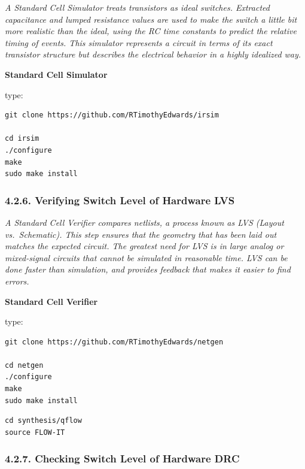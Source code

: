 \documentclass[
]{article}
\begin{document}
\emph{A Standard Cell Simulator treats transistors as ideal switches.
Extracted capacitance and lumped resistance values are used to make the
switch a little bit more realistic than the ideal, using the RC time
constants to predict the relative timing of events. This simulator
represents a circuit in terms of its exact transistor structure but
describes the electrical behavior in a highly idealized way.}

\textbf{Standard Cell Simulator}

type:

\begin{verbatim}
git clone https://github.com/RTimothyEdwards/irsim

cd irsim
./configure
make
sudo make install
\end{verbatim}

\hypertarget{verifying-switch-level-of-hardware-lvs}{%
\subsubsection{4.2.6. Verifying Switch Level of Hardware
LVS}\label{verifying-switch-level-of-hardware-lvs}}

\emph{A Standard Cell Verifier compares netlists, a process known as LVS
(Layout vs.~Schematic). This step ensures that the geometry that has
been laid out matches the expected circuit. The greatest need for LVS is
in large analog or mixed-signal circuits that cannot be simulated in
reasonable time. LVS can be done faster than simulation, and provides
feedback that makes it easier to find errors.}

\textbf{Standard Cell Verifier}

type:

\begin{verbatim}
git clone https://github.com/RTimothyEdwards/netgen

cd netgen
./configure
make
sudo make install
\end{verbatim}

\begin{verbatim}
cd synthesis/qflow
source FLOW-IT
\end{verbatim}

\hypertarget{checking-switch-level-of-hardware-drc}{%
\subsubsection{4.2.7. Checking Switch Level of Hardware
DRC}\label{checking-switch-level-of-hardware-drc}}
\end{document}
